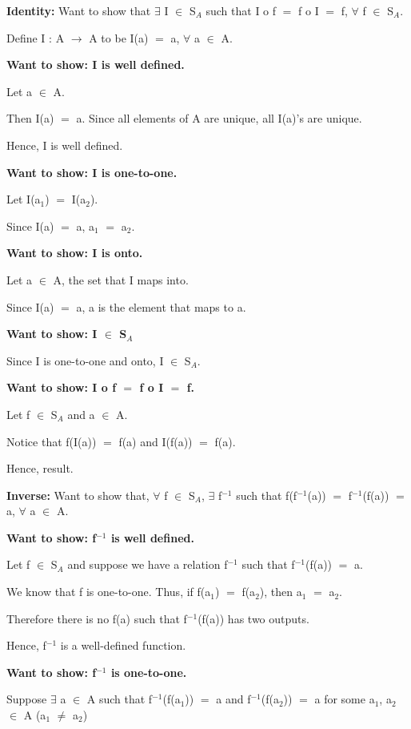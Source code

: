 \documentclass{article}
\newcommand{\mt}[1]{\ensuremath{#1}}
\newcommand{\fa}{\mt{\forall} }          %
\newcommand{\mem}{\mt{\in} }
\newcommand{\exs}{\mt{\exists} }
\newcommand{\lra}{ \mt{\longrightarrow} } %
\newcommand{\eql}{\mt{=} }
\newcommand{\uw}[2]{#1\mt{_{#2}}}
\newcommand{\uf}[2]{#1\mt{^{#2}}}
\begin{document}
\item \textbf{Identity:} Want to show that \exs I \mem \uw{S}{A} such that I o f \eql f o I \eql f, \fa f \mem \uw{S}{A}.

Define I : A \lra A to be I(a) \eql a, \fa a \mem A.

\textbf{Want to show: I is well defined.}

Let a \mem A.

Then I(a) \eql a. Since all elements of A are unique, all I(a)'s are unique.

Hence, I is well defined.

\textbf{Want to show: I is one-to-one.}

Let I(\uw{a}{1}) \eql I(\uw{a}{2}).

Since I(a) \eql a, \uw{a}{1} \eql \uw{a}{2}.

\textbf{Want to show: I is onto.}

Let a \mem A, the set that I maps into.

Since I(a) \eql a, a is the element that maps to a.

\newpage

\textbf{Want to show: I \mem \uw{S}{A}}

Since I is one-to-one and onto, I \mem \uw{S}{A}.

\textbf{Want to show: I o f \eql f o I \eql f.}

Let f \mem \uw{S}{A} and a \mem A.

Notice that f(I(a)) \eql f(a) and I(f(a)) \eql f(a).

Hence, result.

\item \textbf{Inverse:} Want to show that, \fa f \mem \uw{S}{A}, \exs \uf{f}{-1} such that f(\uf{f}{-1}(a)) \eql \uf{f}{-1}(f(a)) \eql a, \fa a \mem A.

\textbf{Want to show: \uf{f}{-1} is well defined.}

Let f \mem \uw{S}{A} and suppose we have a relation \uf{f}{-1} such that \uf{f}{-1}(f(a)) \eql a.

We know that f is one-to-one. Thus, if f(\uw{a}{1}) \eql f(\uw{a}{2}), then \uw{a}{1} \eql \uw{a}{2}.

Therefore there is no f(a) such that \uf{f}{-1}(f(a)) has two outputs.

Hence, \uf{f}{-1} is a well-defined function.

\textbf{Want to show: \uf{f}{-1} is one-to-one.}

Suppose \exs a \mem A such that \uf{f}{-1}(f(\uw{a}{1})) \eql a and \uf{f}{-1}(f(\uw{a}{2})) \eql a for some \uw{a}{1}, \uw{a}{2} \mem A (\uw{a}{1} $\neq$ \uw{a}{2})
\end{document}
